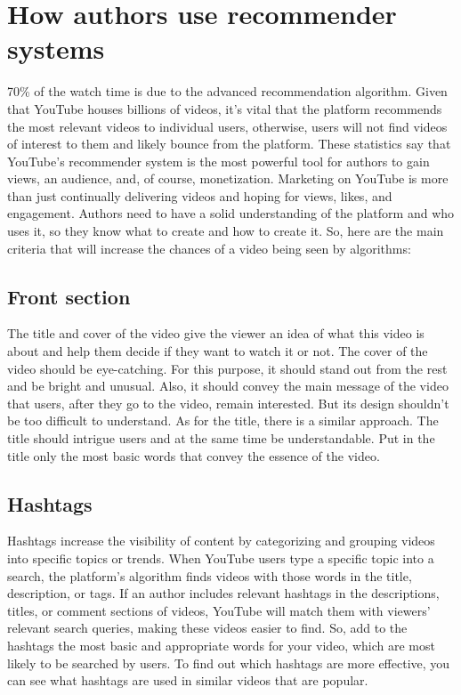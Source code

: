 \documentclass[12pt]{article}
\begin{document}
\section{How authors use recommender systems}

70\% of the watch time is due to the advanced recommendation algorithm. Given that YouTube houses billions of videos, it's vital that the platform recommends the most relevant videos to individual users, otherwise, users will not find videos of interest to them and likely bounce from the platform. These statistics say that YouTube's recommender system is the most powerful tool for authors to gain views, an audience, and, of course, monetization. 
Marketing on YouTube is more than just continually delivering videos and hoping for views, likes, and engagement. Authors need to have a solid understanding of the platform and who uses it, so they know what to create and how to create it. So, here are the main criteria that will increase the chances of a video being seen by algorithms:

\subsection{Front section}

The title and cover of the video give the viewer an idea of what this video is about and help them decide if they want to watch it or not. The cover of the video should be eye-catching. For this purpose, it should stand out from the rest and be bright and unusual. Also, it should convey the main message of the video that users, after they go to the video, remain interested. But its design shouldn't be too difficult to understand. As for the title, there is a similar approach. The title should intrigue users and at the same time be understandable. Put in the title only the most basic words that convey the essence of the video. 

\subsection{Hashtags}

Hashtags increase the visibility of content by categorizing and grouping videos into specific topics or trends. When YouTube users type a specific topic into a search, the platform's algorithm finds videos with those words in the title, description, or tags. If an author includes relevant hashtags in the descriptions, titles, or comment sections of videos, YouTube will match them with viewers' relevant search queries, making these videos easier to find. So, add to the hashtags the most basic and appropriate words for your video, which are most likely to be searched by users. To find out which hashtags are more effective, you can see what hashtags are used in similar videos that are popular.
\end{document}
